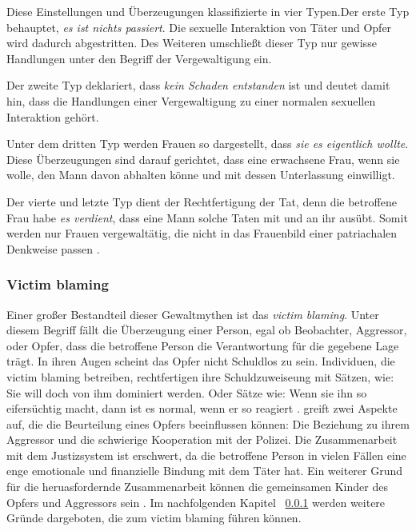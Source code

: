 Diese Einstellungen und Überzeugungen klassifizierte \textcite{Vergewaltigung_Typen_Burt_1991} in vier Typen.Der erste Typ behauptet, \textit{es ist nichts passiert}. Die sexuelle Interaktion von Täter und Opfer wird dadurch abgestritten. Des Weiteren umschließt dieser Typ nur gewisse Handlungen unter den Begriff der Vergewaltigung ein. 

Der zweite Typ deklariert, dass \textit{kein Schaden entstanden} ist und deutet damit hin, dass die Handlungen einer Vergewaltigung zu einer normalen sexuellen Interaktion gehört.

Unter dem dritten Typ werden Frauen so dargestellt, dass \textit{sie es eigentlich wollte}. Diese Überzeugungen sind darauf gerichtet, dass eine erwachsene Frau, wenn sie wolle, den Mann davon abhalten könne und mit dessen Unterlassung einwilligt.

Der vierte und letzte Typ dient der Rechtfertigung der Tat, denn die betroffene Frau habe \textit{es verdient}, dass eine Mann solche Taten mit und an ihr ausübt. Somit werden nur Frauen vergewaltätig, die nicht in das Frauenbild einer patriachalen Denkweise passen \parencite{Vergewaltigung_Typen_Burt_1991}.


\subsubsection{Victim blaming}     \label{2.1.3.2}
Einer großer Bestandteil dieser Gewaltmythen ist das \textit{victim blaming}. Unter diesem Begriff fällt die Überzeugung einer Person, egal ob Beobachter, Aggressor, oder Opfer, dass die betroffene Person die Verantwortung für die gegebene Lage trägt. In ihren Augen scheint das Opfer nicht Schuldlos zu sein. Individuen, die victim blaming betreiben, rechtfertigen ihre Schuldzuweiseung mit Sätzen, wie: Sie will doch von ihm dominiert werden. Oder Sätze wie: Wenn sie ihn so eifersüchtig macht, dann ist es normal, wenn er so reagiert \parencite{DVMAS_deutsch}. \textcite{victim_blaming} greift zwei Aspekte auf, die die Beurteilung eines Opfers beeinflussen können: Die Beziehung zu ihrem Aggressor und die schwierige Kooperation mit der Polizei. Die Zusammenarbeit mit dem Justizsystem ist erschwert, da die betroffene Person in vielen Fällen eine enge emotionale und finanzielle Bindung mit dem Täter hat. Ein weiterer Grund für die heruasfordernde Zusammenarbeit können die gemeinsamen Kinder des Opfers und Aggressors sein \parencite{victim_blaming}. Im nachfolgenden Kapitel ~\ref{2.1.3.2} werden weitere Gründe dargeboten, die zum victim blaming führen können.


